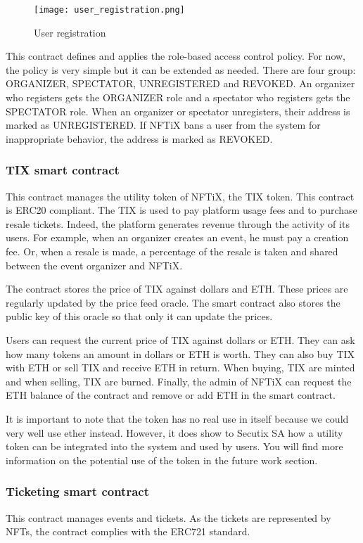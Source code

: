 \documentclass[a4paper,11pt,oneside]{report}
\begin{document}
\begin{figure}[h!]
  \texttt{[image: user\_registration.png]}
  \caption{User registration}
  \label{fig:user_registration}
\end{figure}

This contract defines and applies the role-based access control policy. For now, the policy is very simple but it can be extended as needed. There are four group: ORGANIZER, SPECTATOR, UNREGISTERED and REVOKED. An organizer who registers gets the ORGANIZER role and a spectator who registers gets the SPECTATOR role. When an organizer or spectator unregisters, their address is marked as UNREGISTERED. If NFTiX bans a user from the system for inappropriate behavior, the address is marked as REVOKED.

\subsubsection{TIX smart contract}
This contract manages the utility token of NFTiX, the TIX token. This contract is ERC20 compliant. The TIX is used to pay platform usage fees and to purchase resale tickets. Indeed, the platform generates revenue through the activity of its users. For example, when an organizer creates an event, he must pay a creation fee. Or, when a resale is made, a percentage of the resale is taken and shared between the event organizer and NFTiX.

The contract stores the price of TIX against dollars and ETH. These prices are regularly updated by the price feed oracle. The smart contract also stores the public key of this oracle so that only it can update the prices.

Users can request the current price of TIX against dollars or ETH. They can ask how many tokens an amount in dollars or ETH is worth. They can also buy TIX with ETH or sell TIX and receive ETH in return. When buying, TIX are minted and when selling, TIX are burned. Finally, the admin of NFTiX can request the ETH balance of the contract and remove or add ETH in the smart contract.

It is important to note that the token has no real use in itself because we could very well use ether instead. However, it does show to Secutix SA how a utility token can be integrated into the system and used by users. You will find more information on the potential use of the token in the future work section.

\subsubsection{Ticketing smart contract}
This contract manages events and tickets. As the tickets are represented by NFTs, the contract complies with the ERC721 standard.
\end{document}

